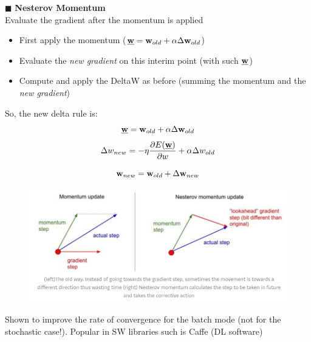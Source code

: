 \documentclass[../main.tex]{subfiles}
\begin{document}
\noindent $\blacksquare$ \textbf{Nesterov Momentum}\\
Evaluate the gradient after the momentum is applied
\begin{itemize}
    \item First apply the momentum ($\underline{\bold{w}} = \bold{w}_{old} + \alpha \Delta \bold{w}_{old}$)
    \item Evaluate the \emph{new gradient} on this interim point (with such $\underline{\bold{w}}$)
    \item Compute and apply the DeltaW as before (summing the momentum and the \emph{new gradient})
\end{itemize}

So, the new delta rule is:
$$\underline{\bold{w}} = \bold{w}_{old} + \alpha \Delta \bold{w}_{old}$$
$$\Delta w_{new}=-\eta \frac{\partial E(\underline{\bold{w}})}{\partial w} + \alpha \Delta w_{old}$$

$$\bold{w}_{new} = \bold{w}_{old} + \Delta \bold{w}_{new}$$

\begin{figure}[H]
    \centering
    \includegraphics[scale = 0.6]{lectures/4_neural_networks/4_momentums.png}
    \label{fig:4_momentums}
\end{figure}
Shown to improve the rate of convergence for the batch mode (not for the stochastic case!). Popular in SW libraries such is Caffe (DL software)
\end{document}
